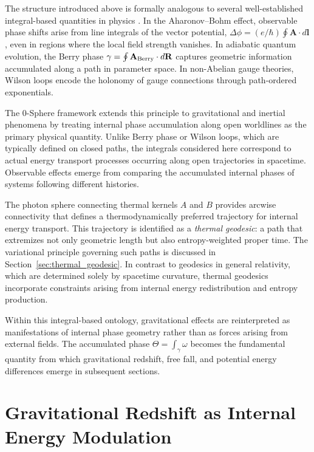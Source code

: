 \documentclass[%
 reprint,
 amsmath,amssymb,
 aps,
 prb,
]{revtex4-2}
\numberwithin{equation}{section}
\begin{document}
The structure introduced above is formally analogous to several well-established integral-based quantities in physics \cite{Hanamura2026LineIntegrals}. In the Aharonov--Bohm effect, observable phase shifts arise from line integrals of the vector potential, $\Delta\phi = (e/\hbar)\oint \mathbf{A}\cdot d\mathbf{l}$, even in regions where the local field strength vanishes. In adiabatic quantum evolution, the Berry phase $\gamma = \oint \mathbf{A}_{\rm Berry}\cdot d\mathbf{R}$ captures geometric information accumulated along a path in parameter space. In non-Abelian gauge theories, Wilson loops encode the holonomy of gauge connections through path-ordered exponentials.

The 0-Sphere framework extends this principle to gravitational and inertial phenomena by treating internal phase accumulation along open worldlines as the primary physical quantity. Unlike Berry phase or Wilson loops, which are typically defined on closed paths, the integrals considered here correspond to actual energy transport processes occurring along open trajectories in spacetime. Observable effects emerge from comparing the accumulated internal phases of systems following different histories.

The photon sphere connecting thermal kernels $A$ and $B$ provides arcwise connectivity that defines a thermodynamically preferred trajectory for internal energy transport. This trajectory is identified as a \emph{thermal geodesic}: a path that extremizes not only geometric length but also entropy-weighted proper time. The variational principle governing such paths is discussed in Section~\ref{sec:thermal_geodesic}. In contrast to geodesics in general relativity, which are determined solely by spacetime curvature, thermal geodesics incorporate constraints arising from internal energy redistribution and entropy production.

Within this integral-based ontology, gravitational effects are reinterpreted as manifestations of internal phase geometry rather than as forces arising from external fields. The accumulated phase $\Theta = \int_\gamma \omega$ becomes the fundamental quantity from which gravitational redshift, free fall, and potential energy differences emerge in subsequent sections.



\section{Gravitational Redshift as Internal Energy Modulation}
\label{sec:grav_redshift}
\end{document}

